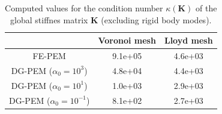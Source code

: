 \begin{table}[!ht]
  \begin{center}
    \begin{tabular}{| c | c | c |}
    \hline
           & Voronoi mesh & Lloyd mesh \\ \hline
    FE-PEM & 9.1e+05 & 4.6e+03 \\ \hline
    DG-PEM ($\alpha_0 = 10^3$) & 4.8e+04 & 4.4e+03 \\ \hline
    DG-PEM ($\alpha_0 = 10^1$) & 1.0e+03 & 2.9e+03 \\ \hline
    DG-PEM ($\alpha_0 = 10^{-1}$) & 8.1e+02 & 2.7e+03 \\
    \hline
    \end{tabular}
    \caption{Computed values for the condition number $\kappa(\mathbf{K})$ of the global stiffnes matrix $\mathbf{K}$ (excluding rigid body modes).}
    \vspace{-5pt}
    \label{tab:global_stiffness_condition_number}
    \vspace{-25pt}
  \end{center}
\end{table}









